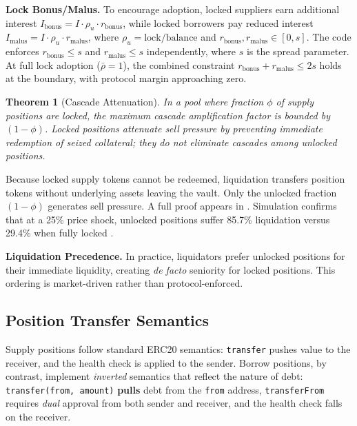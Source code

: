 \documentclass[10pt,a4paper,twocolumn]{article}
\theoremstyle{definition}
\theoremstyle{plain}
\newtheorem{theorem}{Theorem}[section]
\theoremstyle{remark}
\begin{document}
\textbf{Lock Bonus/Malus.} To encourage adoption, locked suppliers earn additional interest $I_{\text{bonus}} = I \cdot \rho_u \cdot r_{\text{bonus}}$, while locked borrowers pay reduced interest $I_{\text{malus}} = I \cdot \rho_u \cdot r_{\text{malus}}$, where $\rho_u = \text{lock}/\text{balance}$ and $r_{\text{bonus}}, r_{\text{malus}} \in [0, s]$. The code enforces $r_{\text{bonus}} \leq s$ and $r_{\text{malus}} \leq s$ independently, where $s$ is the spread parameter. At full lock adoption ($\bar{\rho} = 1$), the combined constraint $r_{\text{bonus}} + r_{\text{malus}} \leq 2s$ holds at the boundary, with protocol margin approaching zero.

\begin{theorem}[Cascade Attenuation]
\label{thm:cascade}
In a pool where fraction $\phi$ of supply positions are locked, the maximum cascade amplification factor is bounded by $(1{-}\phi)$. Locked positions attenuate sell pressure by preventing immediate redemption of seized collateral; they do not eliminate cascades among unlocked positions.
\end{theorem}

Because locked supply tokens cannot be redeemed, liquidation transfers position tokens without underlying assets leaving the vault. Only the unlocked fraction $(1{-}\phi)$ generates sell pressure. A full proof appears in \cite[\S B]{apx}. Simulation confirms that at a 25\% price shock, unlocked positions suffer 85.7\% liquidation versus 29.4\% when fully locked \cite[\S E]{apx}.

\textbf{Liquidation Precedence.} In practice, liquidators prefer unlocked positions for their immediate liquidity, creating \emph{de facto} seniority for locked positions. This ordering is market-driven rather than protocol-enforced.

\subsection{Position Transfer Semantics}
\label{subsec:transfer}

Supply positions follow standard ERC20 semantics: \texttt{transfer} pushes value to the receiver, and the health check is applied to the sender. Borrow positions, by contrast, implement \emph{inverted} semantics that reflect the nature of debt: \texttt{transfer(from, amount)} \textbf{pulls} debt from the \texttt{from} address, \texttt{transferFrom} requires \emph{dual} approval from both sender and receiver, and the health check falls on the receiver.
\end{document}
